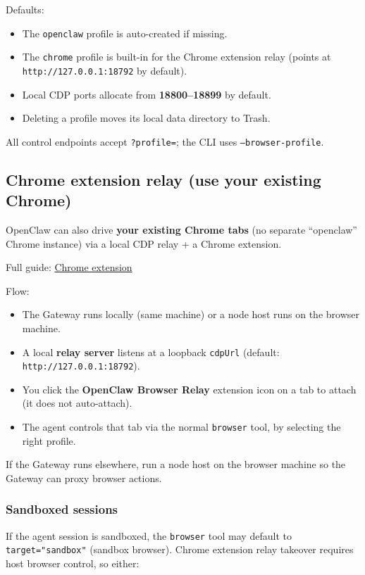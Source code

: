 Defaults:

\begin{itemize}
  \item The \texttt{openclaw} profile is auto-created if missing.
  \item The \texttt{chrome} profile is built-in for the Chrome extension relay (points at \texttt{http://127.0.0.1:18792} by default).
  \item Local CDP ports allocate from \textbf{18800–18899} by default.
  \item Deleting a profile moves its local data directory to Trash.
\end{itemize}


All control endpoints accept \texttt{?profile=}; the CLI uses \texttt{--browser-profile}.

\subsection{Chrome extension relay (use your existing Chrome)}


OpenClaw can also drive \textbf{your existing Chrome tabs} (no separate “openclaw” Chrome instance) via a local CDP relay + a Chrome extension.

Full guide: \href{/tools/chrome-extension}{Chrome extension}

Flow:

\begin{itemize}
  \item The Gateway runs locally (same machine) or a node host runs on the browser machine.
  \item A local \textbf{relay server} listens at a loopback \texttt{cdpUrl} (default: \texttt{http://127.0.0.1:18792}).
  \item You click the \textbf{OpenClaw Browser Relay} extension icon on a tab to attach (it does not auto-attach).
  \item The agent controls that tab via the normal \texttt{browser} tool, by selecting the right profile.
\end{itemize}


If the Gateway runs elsewhere, run a node host on the browser machine so the Gateway can proxy browser actions.

\subsubsection{Sandboxed sessions}


If the agent session is sandboxed, the \texttt{browser} tool may default to \texttt{target="sandbox"} (sandbox browser).
Chrome extension relay takeover requires host browser control, so either:

